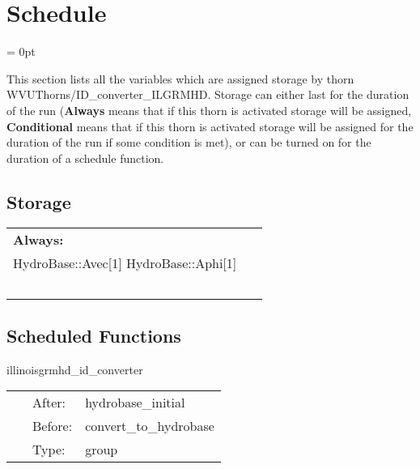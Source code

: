 
\section{Schedule} 


\parskip = 0pt


\noindent This section lists all the variables which are assigned storage by thorn WVUThorns/ID\_converter\_ILGRMHD.  Storage can either last for the duration of the run ({\bf Always} means that if this thorn is activated storage will be assigned, {\bf Conditional} means that if this thorn is activated storage will be assigned for the duration of the run if some condition is met), or can be turned on for the duration of a schedule function.


\subsection*{Storage}

\hspace{5mm}

 \begin{tabular*}{160mm}{ll} 

{\bf Always:}&  ~ \\ 
 HydroBase::Avec[1] HydroBase::Aphi[1] & ~\\ 
~ & ~\\ 
\end{tabular*} 


\subsection*{Scheduled Functions}
\vspace{5mm}


\hspace{5mm} illinoisgrmhd\_id\_converter 

\hspace{5mm}{\it translate et-generated, hydrobase-compatible initial data and convert into variables used by illinoisgrmhd } 


\hspace{5mm}

 \begin{tabular*}{160mm}{cll} 
~ & After:  & hydrobase\_initial \\ 
~ & Before:  & convert\_to\_hydrobase \\ 
~ & Type:  & group \\ 
\end{tabular*} 


